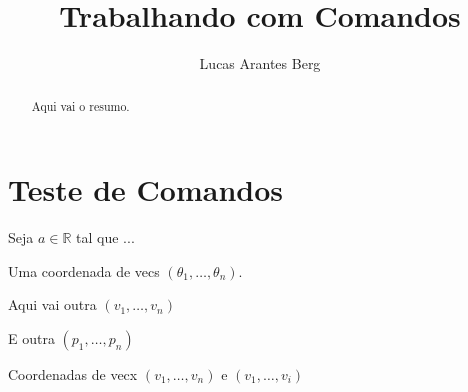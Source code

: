 \documentclass[]{article}
\title{Trabalhando com Comandos}
\author{Lucas Arantes Berg}
\newcommand{\R}{\mathbb{R}}
\newcommand{\vecs}[1]{(#1_1,\dots,#1_n)}
\newcommand{\vecx}[2][n]{(#2_1,\dots,#2_{#1})}
\begin{document}
\maketitle

\begin{abstract}
	Aqui vai o resumo.
\end{abstract}

\section{Teste de Comandos}

Seja $a \in \R$ tal que ...

Uma coordenada de vecs $\vecs \theta$.

Aqui vai outra $\vecs v$

E outra $\vecs p$

Coordenadas de vecx $\vecx{v}$ e $\vecx[i]{v}$ 
\end{document}

